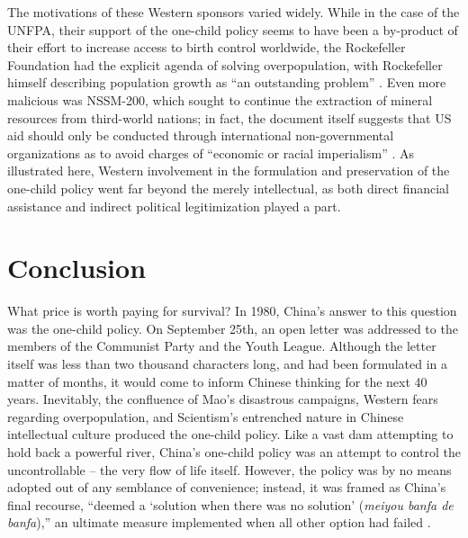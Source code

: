 \documentclass[12pt, a4paper, twoside]{article}
\begin{document}
The motivations of these Western sponsors varied widely. While in the case of the UNFPA, their support of the one-child policy seems to have been a by-product of their effort to increase access to birth control worldwide, the Rockefeller Foundation had the explicit agenda of solving overpopulation, with Rockefeller himself describing population growth as “an outstanding problem” \autocite[p.\ 954]{WangEtAl2016AJS}. Even more malicious was NSSM-200, which sought to continue the extraction of mineral resources from third-world nations; in fact, the document itself suggests that US aid should only be conducted through international non-governmental organizations as to avoid charges of “economic or racial imperialism” \autocite[p.\ 382--383]{Grimes1998ReproductiveRights}. As illustrated here, Western involvement in the formulation and preservation of the one-child policy went far beyond the merely intellectual, as both direct financial assistance and indirect political legitimization played a part.

\section{Conclusion}

What price is worth paying for survival? In 1980, China’s answer to this question was the one-child policy. On September 25th, an open letter was addressed to the members of the Communist Party and the Youth League. Although the letter itself was less than two thousand characters long, and had been formulated in a matter of months, it would come to inform Chinese thinking for the next 40 years. Inevitably, the confluence of Mao’s disastrous campaigns, Western fears regarding overpopulation, and Scientism’s entrenched nature in Chinese intellectual culture produced the one-child policy. Like a vast dam attempting to hold back a powerful river, China’s one-child policy was an attempt to control the uncontrollable – the very flow of life itself. However, the policy was by no means adopted out of any semblance of convenience; instead, it was framed as China’s final recourse, “deemed a ‘solution when there was no solution’ (\emph{meiyou banfa de banfa}),” an ultimate measure implemented when all other option had failed \autocite[p.\ 287]{Greenhalgh2008JustOneChild}. 
\end{document}
